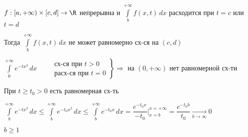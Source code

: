 \begin{consequence}\thmslashn
	
	$f : [a, +\infty) \times [c, d] \to \R$ непрерывна и $\int\limits_{b}^{+\infty}f(x, t)\,dx$ расходится при $t = c$ или $t = d$
	
	Тогда $\int\limits_{b}^{+\infty}f(x, t)\,dx$ не может равномерно сх-ся на $(c, d)$
	
\end{consequence}

\begin{example}\thmslashn
	
	$\int\limits_{0}^{+\infty} e^{-tx^2}\,dx \quad$ $
	\left.
	\begin{aligned}
	&\text{сх-ся при }t > 0 \\
	&\text{расх-ся при } t = 0
	\end{aligned}
	\right\rbrace \Rightarrow$ на $(0, +\infty)$ нет равномерной сх-ти
	
	При $t \geqslant t_0 > 0$ есть равномерная сх-ть 
	
	$\int\limits_{b}^{+\infty} e^{-tx^2}\,dx \leqslant \int\limits_{b}^{+\infty} e^{-t_0x^2}\,dx \leqslant \int\limits_{b}^{+\infty} e^{-t_0x}\,dx = \dfrac{e^{-t_0x}}{-t_0}\Big|_{x=b}^{x = +\infty} = \dfrac{e^{-t_0b}}{t_0} \underset{b \to \infty}\to 0$
	
	$b \geqslant 1$
	
\end{example}
